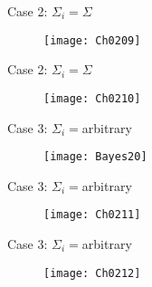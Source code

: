 
\begin{frame}{Case 2: $\Sigma_i=\Sigma$}
\begin{figure}
\texttt{[image: Ch0209]}
\end{figure}
\end{frame}

\begin{frame}{Case 2: $\Sigma_i=\Sigma$}
\begin{figure}
\texttt{[image: Ch0210]}
\end{figure}
\end{frame}


\begin{frame}{Case 3: $\Sigma_i=$arbitrary}
\begin{figure}
\texttt{[image: Bayes20]}
\end{figure}
\end{frame}


\begin{frame}{Case 3: $\Sigma_i=$arbitrary}
\begin{figure}
\texttt{[image: Ch0211]}
\end{figure}
\end{frame}

\begin{frame}{Case 3: $\Sigma_i=$arbitrary}
\begin{figure}
\texttt{[image: Ch0212]}
\end{figure}
\end{frame}


%

